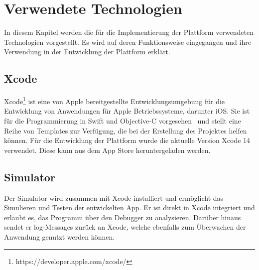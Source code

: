     \chapter{Verwendete Technologien}\label{ch:verwendete-technologien}
    In diesem Kapitel werden die für die Implementierung der Plattform verwendeten Technologien vorgestellt.
    Es wird auf deren Funktionsweise eingegangen und ihre Verwendung in der Entwicklung der Plattform erklärt.


    \section{Xcode}\label{sec:xcode}
    Xcode\footnote{https://developer.apple.com/xcode/} ist eine von Apple bereitgestellte Entwicklungsumgebung für die Entwicklung von Anwendungen für Apple Betriebssysteme, darunter iOS.
    Sie ist für die Programmierung in Swift und Objective-C vorgesehen~\cite{xcode} und stellt eine Reihe von Templates zur Verfügung, die bei der Erstellung des Projektes helfen können.
    Für die Entwicklung der Plattform wurde die aktuelle Version Xcode 14 verwendet.
    Diese kann aus dem App Store heruntergeladen werden.

    \section{Simulator}\label{sec:simulator}
    Der Simulator wird zusammen mit Xcode installiert und ermöglicht das Simulieren und Testen der entwickelten App.
    Er ist direkt in Xcode integriert und erlaubt es, das Programm über den Debugger zu analysieren.
    Darüber hinaus sendet er log-Messages zurück an Xcode, welche ebenfalls zum Überwachen der Anwendung genutzt werden können.


%
%
%


    \newpage
